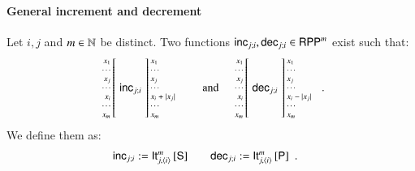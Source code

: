 \paragraph{General increment and decrement} 
Let $ i, j $ and $ m\in \mathbb{N} $ be distinct.
Two functions $ \mathsf{inc}_{j;i}, \mathsf{dec}_{j;i}\in \mathsf{RPP}^m $ exist such that:
\begin{align*}
\arraycolsep=1.4pt
\begin{array}{rcl}
 \left. {\scriptsize \begin{array}{r} x_1\\ \cdots \\ x_j\\ \cdots \\ x_i       \\ \cdots \\x_m\end{array}} \right[
 & \rprInc_{j;i} &
 \left] {\scriptsize \begin{array}{l} x_1\\ \cdots \\ x_j\\ \cdots \\ x_i + |x_j|\\ \cdots \\x_m \end{array} } \right.
\end{array}
&\qquad\textrm{and}&
\arraycolsep=1.4pt
\begin{array}{rcl}
 \left. {\scriptsize \begin{array}{r} x_1\\ \cdots \\ x_j\\ \cdots \\ x_i      \\ \cdots \\x_m\end{array}} \right[
 & \rprDec_{j;i} &
 \left] {\scriptsize \begin{array}{l} x_1\\ \cdots \\ x_j\\ \cdots \\ x_i - |x_j|\\ \cdots \\x_m \end{array} } \right.
\end{array}
\enspace.
\end{align*}
We define them as:
\begin{align*}
\mathsf{inc}_{j;i}  & := {\mathsf{It}^{m}_{j,\langle i\rangle }\left[ \mathsf{S} \right]} 
&&&
\mathsf{dec}_{j;i}  & := {\mathsf{It}^{m}_{j,\langle i\rangle}\left[ \mathsf{P} \right]}
\enspace .
\end{align*}

